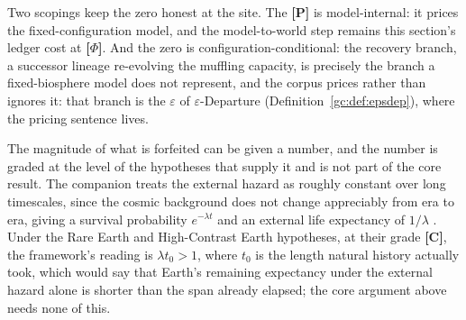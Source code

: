 \begin{proposition}
Two scopings keep the zero honest at the site. The \textbf{[P]} is
model-internal: it prices the fixed-configuration model, and the
model-to-world step remains this section's ledger cost at
\textbf{[$\Phi$]}. And the zero is configuration-conditional: the
recovery branch, a successor lineage re-evolving the muffling
capacity, is precisely the branch a fixed-biosphere model does not
represent, and the corpus prices rather than ignores it: that branch
is the $\varepsilon$ of $\varepsilon$-Departure
(Definition~\ref{gc:def:epsdep}), where the pricing sentence lives.
\end{proposition}

The magnitude of what is forfeited can be given a number, and the
number is graded at the level of the hypotheses that supply it and is
not part of the core result. The companion treats the external hazard
as roughly constant over long timescales, since the cosmic background
does not change appreciably from era to era, giving a survival
probability $e^{-\lambda t}$ and an external life expectancy of
$1/\lambda$ \cite{Nexus}. Under the Rare Earth and High-Contrast Earth
hypotheses, at their grade \textbf{[C]}, the framework's reading is
$\lambda t_0>1$, where $t_0$ is the length natural history actually
took, which would say that Earth's remaining expectancy under the
external hazard alone is shorter than the span already elapsed; the
core argument above needs none of this.

